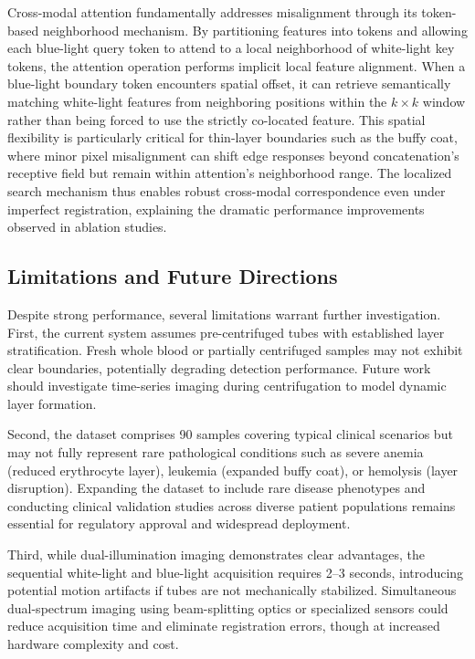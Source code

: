 \documentclass[journal,twoside,web]{ieeecolor}
\begin{document}
Cross-modal attention fundamentally addresses misalignment through its token-based neighborhood mechanism. By partitioning features into tokens and allowing each blue-light query token to attend to a local neighborhood of white-light key tokens, the attention operation performs implicit local feature alignment. When a blue-light boundary token encounters spatial offset, it can retrieve semantically matching white-light features from neighboring positions within the $k \times k$ window rather than being forced to use the strictly co-located feature. This spatial flexibility is particularly critical for thin-layer boundaries such as the buffy coat, where minor pixel misalignment can shift edge responses beyond concatenation's receptive field but remain within attention's neighborhood range. The localized search mechanism thus enables robust cross-modal correspondence even under imperfect registration, explaining the dramatic performance improvements observed in ablation studies.

\subsection{Limitations and Future Directions}

Despite strong performance, several limitations warrant further investigation. First, the current system assumes pre-centrifuged tubes with established layer stratification. Fresh whole blood or partially centrifuged samples may not exhibit clear boundaries, potentially degrading detection performance. Future work should investigate time-series imaging during centrifugation to model dynamic layer formation.

Second, the dataset comprises 90 samples covering typical clinical scenarios but may not fully represent rare pathological conditions such as severe anemia (reduced erythrocyte layer), leukemia (expanded buffy coat), or hemolysis (layer disruption). Expanding the dataset to include rare disease phenotypes and conducting clinical validation studies across diverse patient populations remains essential for regulatory approval and widespread deployment.

Third, while dual-illumination imaging demonstrates clear advantages, the sequential white-light and blue-light acquisition requires 2--3 seconds, introducing potential motion artifacts if tubes are not mechanically stabilized. Simultaneous dual-spectrum imaging using beam-splitting optics or specialized sensors could reduce acquisition time and eliminate registration errors, though at increased hardware complexity and cost.
\end{document}
